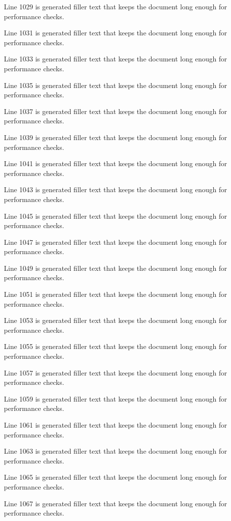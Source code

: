 Line 1029 is generated filler text that keeps the document long enough for performance checks.

Line 1031 is generated filler text that keeps the document long enough for performance checks.

Line 1033 is generated filler text that keeps the document long enough for performance checks.

Line 1035 is generated filler text that keeps the document long enough for performance checks.

Line 1037 is generated filler text that keeps the document long enough for performance checks.

Line 1039 is generated filler text that keeps the document long enough for performance checks.

Line 1041 is generated filler text that keeps the document long enough for performance checks.

Line 1043 is generated filler text that keeps the document long enough for performance checks.

Line 1045 is generated filler text that keeps the document long enough for performance checks.

Line 1047 is generated filler text that keeps the document long enough for performance checks.

Line 1049 is generated filler text that keeps the document long enough for performance checks.

Line 1051 is generated filler text that keeps the document long enough for performance checks.

Line 1053 is generated filler text that keeps the document long enough for performance checks.

Line 1055 is generated filler text that keeps the document long enough for performance checks.

Line 1057 is generated filler text that keeps the document long enough for performance checks.

Line 1059 is generated filler text that keeps the document long enough for performance checks.

Line 1061 is generated filler text that keeps the document long enough for performance checks.

Line 1063 is generated filler text that keeps the document long enough for performance checks.

Line 1065 is generated filler text that keeps the document long enough for performance checks.

Line 1067 is generated filler text that keeps the document long enough for performance checks.

